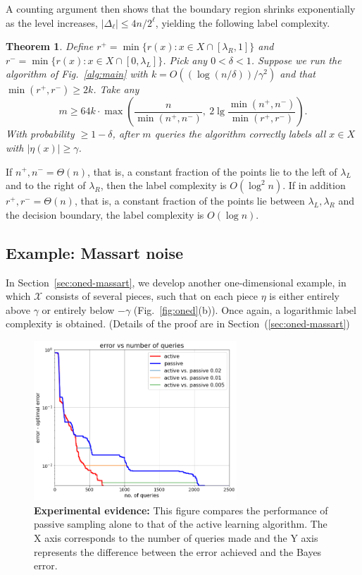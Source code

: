 \documentclass[twoside]{article}
\def\X{{\mathcal X}}
\newtheorem{thm}{Theorem}
\begin{document}
A counting argument then shows that the boundary region shrinks exponentially as the level increases, $|\Delta_\ell| \leq 4n/2^\ell$, yielding the following label complexity. 
\begin{thm}
Define $r^+ = \min \{r(x): x \in X \cap [\lambda_R,1]\}$ and $r^- = \min \{r(x): x \in X \cap [0,\lambda_L]\}$. Pick any $0 < \delta < 1$. Suppose we run the algorithm of Fig.~\ref{alg:main} with $k = O((\log (n/\delta))/\gamma^2)$ and that $\min(r^+, r^-) \geq 2k$.  Take any 
$$ m \geq 64k \cdot \max \left( \frac{n}{\min(n^+,n^-)}, \ 2 \lg \frac{\min(n^+,n^-)}{\min(r^+,r^-)} \right) .$$
With probability $\geq 1-\delta$, after $m$ queries the algorithm correctly labels all $x \in X$ with $|\eta(x)| \geq \gamma$.
\label{thm:oned-monotonic}
\end{thm}
If $n^+, n^- = \Theta(n)$, that is, a constant fraction of the points lie to the left of $\lambda_L$ and to the right of $\lambda_R$, then the label complexity is $O(\log^2 n)$. If in addition $r^+, r^- = \Theta(n)$, that is, a constant fraction of the points lie between $\lambda_L, \lambda_R$ and the decision boundary, the label complexity is $O(\log n)$. 

\subsection{Example: Massart noise}
\label{sec:example-massart}

In Section~\ref{sec:oned-massart}, we develop another one-dimensional example, in which $\X$ consists of several pieces, such that on each piece $\eta$ is either entirely above $\gamma$ or entirely below $-\gamma$ (Fig.~\ref{fig:oned}(b)). Once again, a logarithmic label complexity is obtained. (Details of the proof are in Section~(\ref{sec:oned-massart})

\begin{figure}
\begin{center}
\includegraphics[width=3in]{figures/MassartExperiment5.png}
\end{center}
\caption{{\bf Experimental evidence:} This figure compares the
  performance of passive sampling alone to that of the active learning
  algorithm. The X axis corresponds to the number of queries made and the
  Y axis represents the difference between the error achieved and the
  Bayes error.}
\label{fig:Experiments}
\end{figure}
\end{document}
